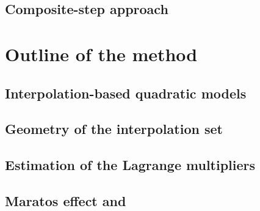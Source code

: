 \subsection{Composite-step approach}

\section{Outline of the  method}

\subsection{Interpolation-based quadratic models}

\subsection{Geometry of the interpolation set}

\subsection{Estimation of the Lagrange multipliers}

\subsection{Maratos effect and }
